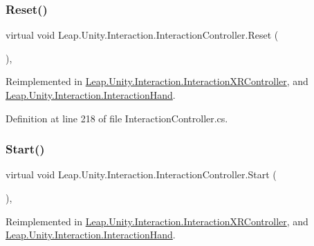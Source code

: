\subsubsection{\texorpdfstring{Reset()}{Reset()}}
{\footnotesize\ttfamily virtual void Leap.\+Unity.\+Interaction.\+Interaction\+Controller.\+Reset (\begin{DoxyParamCaption}{ }\end{DoxyParamCaption})\hspace{0.3cm}{\ttfamily [protected]}, {\ttfamily [virtual]}}



Reimplemented in \mbox{\hyperlink{class_leap_1_1_unity_1_1_interaction_1_1_interaction_x_r_controller_a17a8608c8d69b586256fbcb9877394b3}{Leap.\+Unity.\+Interaction.\+Interaction\+X\+R\+Controller}}, and \mbox{\hyperlink{class_leap_1_1_unity_1_1_interaction_1_1_interaction_hand_abce682528cf0c3d2bd353c3ed86e72e5}{Leap.\+Unity.\+Interaction.\+Interaction\+Hand}}.



Definition at line 218 of file Interaction\+Controller.\+cs.

\mbox{\label{class_leap_1_1_unity_1_1_interaction_1_1_interaction_controller_a697f206b8e73d177c203b3ca12874cb6}} 
\subsubsection{\texorpdfstring{Start()}{Start()}}
{\footnotesize\ttfamily virtual void Leap.\+Unity.\+Interaction.\+Interaction\+Controller.\+Start (\begin{DoxyParamCaption}{ }\end{DoxyParamCaption})\hspace{0.3cm}{\ttfamily [protected]}, {\ttfamily [virtual]}}



Reimplemented in \mbox{\hyperlink{class_leap_1_1_unity_1_1_interaction_1_1_interaction_x_r_controller_ac50b109d0cd82bb14cd8a19199850c9e}{Leap.\+Unity.\+Interaction.\+Interaction\+X\+R\+Controller}}, and \mbox{\hyperlink{class_leap_1_1_unity_1_1_interaction_1_1_interaction_hand_a83cd2a6e82f7213b6dc2f17667c6389d}{Leap.\+Unity.\+Interaction.\+Interaction\+Hand}}.



